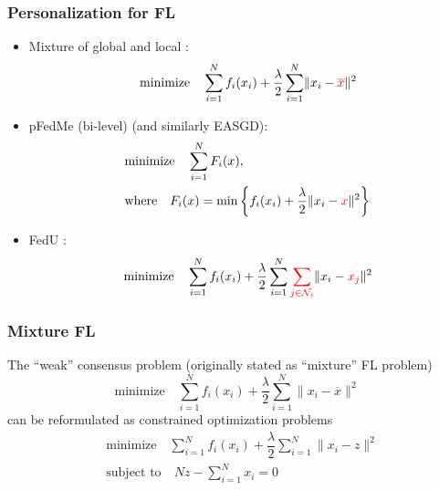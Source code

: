 
\begin{frame}
\frametitle{Personalization for FL}

\begin{itemize}
    \item Mixture of global and local \cite{hanzely2020federated}:
    $$\text{minimize} \quad \sum\limits_{i=1}^N f_i(x_i) + \dfrac{\lambda}{2} \sum\limits_{i=1}^N \lVert x_i - {\color{red} \overline{x}} \rVert^2$$
    \item pFedMe (bi-level) \cite{t2020pfedme} (and similarly EASGD\cite{zhang2015easgd}):
    \begin{align*}
        & \text{minimize} \quad \sum\limits_{i=1}^N F_i(x), \\
        & \text{where} \quad F_i(x) = \min \left\{ f_i(x_i) + \dfrac{\lambda}{2} \lVert x_i - {\color{red} x}\rVert^2 \right\}
    \end{align*}
    \item FedU \cite{dinh2021fedu}:
    $$\text{minimize} \quad \sum\limits_{i=1}^N f_i(x_i) + \dfrac{\lambda}{2} \sum\limits_{i=1}^N {\color{red} \sum\limits_{j\in\mathcal{N}_i}} \lVert x_i - {\color{red} x_j} \rVert^2$$
\end{itemize}

\end{frame}


\begin{frame}
\frametitle{Mixture FL}

The {\color{red} ``weak'' consensus problem} (originally stated as ``mixture'' FL problem)
$$\text{minimize} \quad \sum\limits_{i=1}^N f_i(x_i) + \dfrac{\lambda}{2} \sum\limits_{i=1}^N \lVert x_i - \overline{x} \rVert^2$$
can be reformulated as constrained optimization problems
\begin{align*}
    & \text{minimize} \quad \sum\limits_{i=1}^N f_i(x_i) + \dfrac{\lambda}{2} \sum\limits_{i=1}^N \lVert x_i - z \rVert^2 \\
    & \text{subject to} \quad Nz - \sum\limits_{i=1}^N x_i = 0
\end{align*}

\end{frame}


